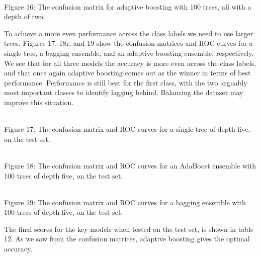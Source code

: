 \documentclass[11pt]{article}
\begin{document}
  \begin{center}
 \end{center}
 { \hspace*{\fill} \\}
 Figure 16: The confusion matrix for adaptive boosting with 100 trees, all with a depth of two.
 
 To achieve a more even performance across the class labels we need to use larger trees. Figures 17, 18r, and 19 show the confusion matrices and ROC curves for a single tree, a bagging ensemble, and an adaptive boosting ensemble, respectively. We see that for all three models the accuracy is more even across the class labels, and that once again adaptive boosting comes out as the winner in terms of best performance. Performance is still best for the first class, with the two arguably most important classes to identify lagging behind. Balancing the dataset may improve this situation. 
 
   \begin{center}
 \end{center}
 { \hspace*{\fill} \\}
 Figure 17: The confusion matrix and ROC curves for a single tree of depth five, on the test set.
 
    \begin{center}
 \end{center}
 { \hspace*{\fill} \\}
 Figure 18: The confusion matrix and ROC curves for an AdaBoost ensemble with 100 trees of depth five, on the test set.
 
     \begin{center}
 \end{center}
 { \hspace*{\fill} \\}
 Figure 19: The confusion matrix and ROC curves for a bagging ensemble with 100 trees of depth five, on the test set.
 
The final scores for the key models when tested on the test set, is shown in table 12. As we saw from the confusion matrices, adaptive boosting gives the optimal accuracy.
\end{document}
